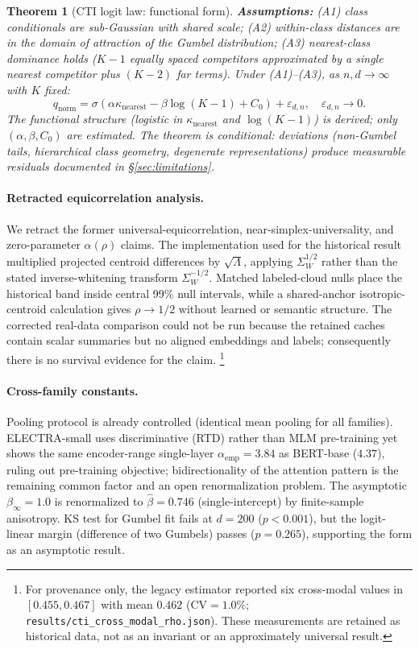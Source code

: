 \documentclass{article}
\newtheorem{theorem}{Theorem}
\begin{document}
\begin{theorem}[CTI logit law: functional form]
\label{thm:cti}
\textbf{Assumptions:} (A1) class conditionals are sub-Gaussian with shared scale; (A2) within-class distances are in the domain of attraction of the Gumbel distribution; (A3) nearest-class dominance holds ($K-1$ equally spaced competitors approximated by a single nearest competitor plus $(K-2)$ far terms). Under (A1)--(A3), as $n,d\to\infty$ with $K$ fixed:
\[
q_{\mathrm{norm}}
=\sigma\!\left(\alpha\kappa_{\mathrm{nearest}}-\beta\log(K-1)+C_0\right)+\varepsilon_{d,n},
\quad \varepsilon_{d,n}\to0.
\]
The functional structure (logistic in $\kappa_{\mathrm{nearest}}$ and $\log(K-1)$) is derived; only $(\alpha,\beta,C_0)$ are estimated. The theorem is \emph{conditional}: deviations (non-Gumbel tails, hierarchical class geometry, degenerate representations) produce measurable residuals documented in \S\ref{sec:limitations}.
\end{theorem}

\paragraph{Retracted equicorrelation analysis.}
We retract the former universal-equicorrelation, near-simplex-universality, and zero-parameter $\alpha(\rho)$ claims.
The implementation used for the historical result multiplied projected centroid differences by $\sqrt{\Lambda}$, applying $\Sigma_W^{1/2}$ rather than the stated inverse-whitening transform $\Sigma_W^{-1/2}$.
Matched labeled-cloud nulls place the historical band inside central 99\% null intervals, while a shared-anchor isotropic-centroid calculation gives $\rho\to1/2$ without learned or semantic structure.
The corrected real-data comparison could not be run because the retained caches contain scalar summaries but no aligned embeddings and labels; consequently there is no survival evidence for the claim.
\footnote{For provenance only, the legacy estimator reported six cross-modal values in $[0.455,0.467]$ with mean $0.462$ (CV$=1.0\%$; \texttt{results/cti\_cross\_modal\_rho.json}). These measurements are retained as historical data, not as an invariant or an approximately universal result.}

\paragraph{Cross-family constants.}
Pooling protocol is already controlled (identical mean pooling for all families).
ELECTRA-small uses discriminative (RTD) rather than MLM pre-training yet shows the same encoder-range single-layer $\alpha_\mathrm{emp}=3.84$ as BERT-base ($4.37$), ruling out pre-training objective; bidirectionality of the attention pattern is the remaining common factor and an open renormalization problem.
The asymptotic $\beta_\infty=1.0$ is renormalized to $\hat\beta=0.746$ (single-intercept) by finite-sample anisotropy.
KS test for Gumbel fit fails at $d=200$ ($p<0.001$), but the logit-linear margin (difference of two Gumbels) passes ($p=0.265$), supporting the form as an asymptotic result.
\end{document}
